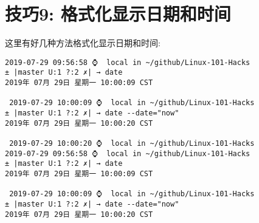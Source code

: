 \documentclass[UTF8]{ctexart}
\begin{document}
\section*{技巧9: 格式化显示日期和时间}
这里有好几种方法格式化显示日期和时间:
\begin{lstlisting}
2019-07-29 09:56:58 ⌚  local in ~/github/Linux-101-Hacks                                                                                                                    
± |master U:1 ?:2 ✗| → date                                                                                                                                                   
2019年 07月 29日 星期一 10:00:09 CST                                                                                                                                          
                                                                                                                                                                              
 2019-07-29 10:00:09 ⌚  local in ~/github/Linux-101-Hacks                                                                                                                    
± |master U:1 ?:2 ✗| → date --date="now"                                                                                                                                      
2019年 07月 29日 星期一 10:00:20 CST                                                                                                                                          
                                                                                                                                                                              
 2019-07-29 10:00:20 ⌚  local in ~/github/Linux-101-Hacks
2019-07-29 09:56:58 ⌚  local in ~/github/Linux-101-Hacks                                                                                                                    
± |master U:1 ?:2 ✗| → date                                                                                                                                                   
2019年 07月 29日 星期一 10:00:09 CST                                                                                                                                          
                                                                                                                                                                              
 2019-07-29 10:00:09 ⌚  local in ~/github/Linux-101-Hacks                                                                                                                    
± |master U:1 ?:2 ✗| → date --date="now"                                                                                                                                      
2019年 07月 29日 星期一 10:00:20 CST                                                                                                                                          
                                                                                                                                                                              

\end{lstlisting}
\end{document}
